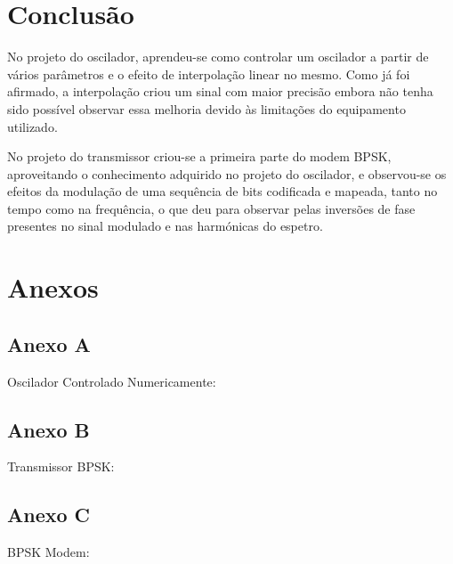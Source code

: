 \documentclass[11pt]{article}
\numberwithin{equation}{section}
\begin{document}
\section{Conclusão}


No projeto do oscilador, aprendeu-se como controlar um oscilador a partir de vários parâmetros e o efeito de interpolação linear no mesmo. Como já foi afirmado, a interpolação criou um sinal com maior precisão embora não tenha sido possível observar essa melhoria devido às limitações do equipamento utilizado.

No projeto do transmissor criou-se a primeira parte do modem BPSK, aproveitando o conhecimento adquirido no projeto do oscilador, e observou-se os efeitos da modulação de uma sequência de bits codificada e mapeada, tanto no tempo como na frequência, o que deu para observar pelas inversões de fase presentes no sinal modulado e nas harmónicas do espetro.

\section{Anexos}
\subsection{Anexo A}
Oscilador Controlado Numericamente:


\subsection{Anexo B}
Transmissor BPSK:


\subsection{Anexo C}
BPSK Modem:

\end{document}

